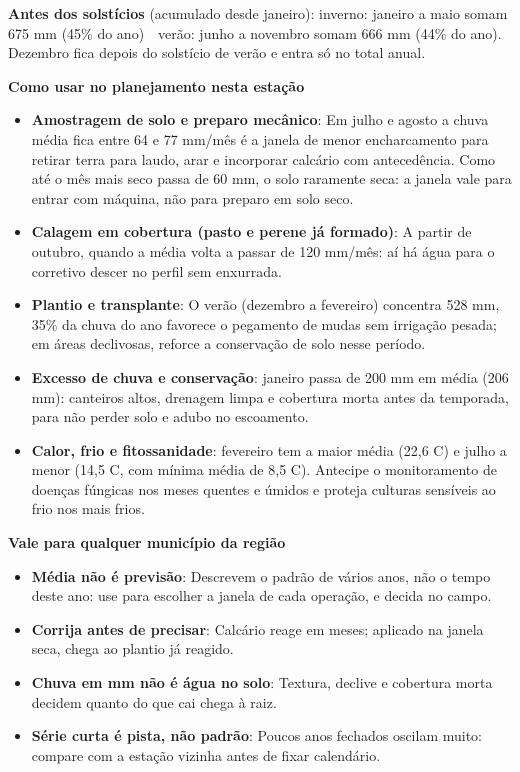 \documentclass[10pt,a4paper]{article}
\begin{document}
\vspace{1pt}
{\footnotesize\textbf{Antes dos solstícios} (acumulado desde janeiro):
inverno: janeiro a maio somam 675 mm (45\% do ano) \,\textbullet\, verão: junho a novembro somam 666 mm (44\% do ano). Dezembro fica depois do solstício de verão e entra só no total
anual.}

\vspace{2pt}
{\bfseries\small Como usar no planejamento nesta estação}

\footnotesize\begin{itemize}\setlength{\itemsep}{0.5pt}
  \item \textbf{Amostragem de solo e preparo mecânico}: Em julho e agosto a chuva média fica entre 64 e 77 mm/mês \textemdash{} é a janela de menor encharcamento para retirar terra para laudo, arar e incorporar calcário com antecedência. Como até o mês mais seco passa de 60 mm, o solo raramente seca: a janela vale para entrar com máquina, não para preparo em solo seco.
  \item \textbf{Calagem em cobertura (pasto e perene já formado)}: A partir de outubro, quando a média volta a passar de 120 mm/mês: aí há água para o corretivo descer no perfil sem enxurrada.
  \item \textbf{Plantio e transplante}: O verão (dezembro a fevereiro) concentra 528 mm, 35\% da chuva do ano \textemdash{} favorece o pegamento de mudas sem irrigação pesada; em áreas declivosas, reforce a conservação de solo nesse período.
  \item \textbf{Excesso de chuva e conservação}: janeiro passa de 200 mm em média (206 mm): canteiros altos, drenagem limpa e cobertura morta antes da temporada, para não perder solo e adubo no escoamento.
  \item \textbf{Calor, frio e fitossanidade}: fevereiro tem a maior média (22,6 \textdegree{}C) e julho a menor (14,5 \textdegree{}C, com mínima média de 8,5 \textdegree{}C). Antecipe o monitoramento de doenças fúngicas nos meses quentes e úmidos e proteja culturas sensíveis ao frio nos mais frios.
\end{itemize}

\vspace{1pt}
{\bfseries\small Vale para qualquer município da região}

\scriptsize\begin{itemize}\setlength{\itemsep}{0.5pt}
  \item \textbf{Média não é previsão}: Descrevem o padrão de vários anos, não o tempo deste ano: use para escolher a janela de cada operação, e decida no campo.
  \item \textbf{Corrija antes de precisar}: Calcário reage em meses; aplicado na janela seca, chega ao plantio já reagido.
  \item \textbf{Chuva em mm não é água no solo}: Textura, declive e cobertura morta decidem quanto do que cai chega à raiz.
  \item \textbf{Série curta é pista, não padrão}: Poucos anos fechados oscilam muito: compare com a estação vizinha antes de fixar calendário.
\end{itemize}
\end{document}
